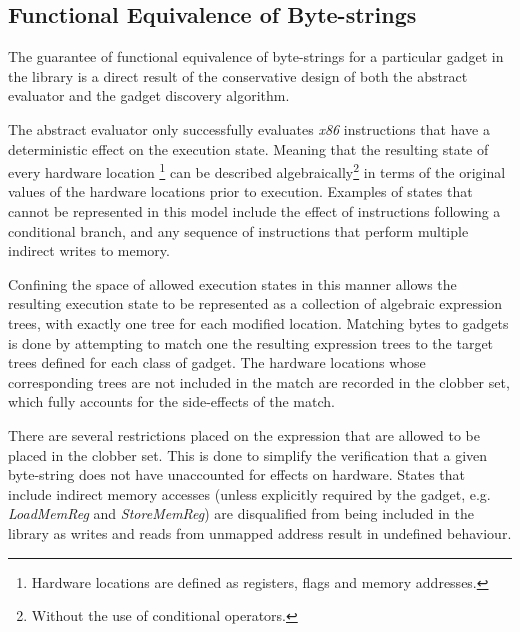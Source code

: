     \subsection{Functional Equivalence of Byte-strings}
    \label{sec:results-gadget-inst-eq}


        The guarantee of functional equivalence of byte-strings for a
        particular gadget in the library is a direct result of the
        conservative design of both the abstract evaluator and the gadget
        discovery algorithm.

        The abstract evaluator only successfully evaluates \emph{x86}
        instructions that have a deterministic effect on the execution state.
        Meaning that the resulting state of every hardware location
        \footnote{Hardware locations are defined as registers, flags and memory
        addresses.} can be described algebraically\footnote{Without the use of
        conditional operators.} in terms of the original values of the hardware
        locations prior to execution. Examples of states that cannot be
        represented in this model include the effect of instructions following a
        conditional branch, and any sequence of instructions that perform
        multiple indirect writes to memory.

        Confining the space of allowed execution states in this manner allows
        the resulting execution state to be represented as a collection of
        algebraic expression trees, with exactly one tree for each modified
        location. Matching bytes to gadgets is done by attempting to match one
        the resulting expression trees to the target trees defined for each
        class of gadget. The hardware locations whose corresponding trees are
        not included in the match are recorded in the clobber set, which fully
        accounts for the side-effects of the
        match.

        There are several restrictions placed on the expression that are allowed
        to be placed in the clobber set. This is done to simplify the
        verification that a given byte-string does not have unaccounted for
        effects on hardware. States that include indirect memory accesses
        (unless explicitly required by the gadget, e.g.  \emph{LoadMemReg} and
        \emph{StoreMemReg}) are disqualified from being included in the library
        as writes and reads from unmapped address result in undefined behaviour.
        
